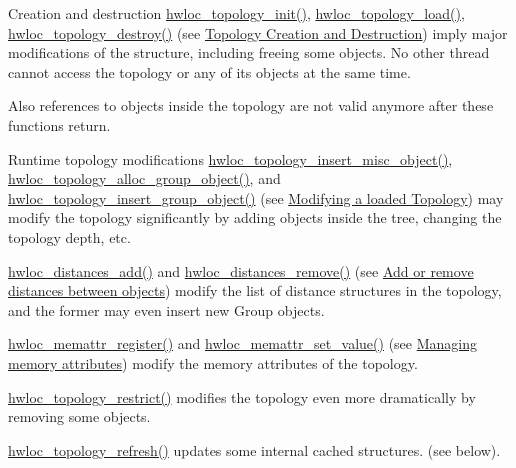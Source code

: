 \begin{DoxyDescription}
\item[Creation and destruction ]{\ttfamily \hyperlink{a00186_ga03fd4a16d8b9ee1ffc32b25fd2f6bdfa}{hwloc\+\_\+topology\+\_\+init()}, \hyperlink{a00186_gabdf58d87ad77f6615fccdfe0535ff826}{hwloc\+\_\+topology\+\_\+load()}, \hyperlink{a00186_ga9f34a640b6fd28d23699d4d084667b15}{hwloc\+\_\+topology\+\_\+destroy()}} (see \hyperlink{a00186}{Topology Creation and Destruction}) imply major modifications of the structure, including freeing some objects. No other thread cannot access the topology or any of its objects at the same time.

Also references to objects inside the topology are not valid anymore after these functions return. 


\item[Runtime topology modifications ]{\ttfamily \hyperlink{a00194_gad980782ade737900c5cf208946768c30}{hwloc\+\_\+topology\+\_\+insert\+\_\+misc\+\_\+object()}}, {\ttfamily \hyperlink{a00194_ga4cea4741165faf5323931a9ed8786ef7}{hwloc\+\_\+topology\+\_\+alloc\+\_\+group\+\_\+object()}}, and {\ttfamily \hyperlink{a00194_ga1fc6012b3e1c249b83f48cb7bcacaa5b}{hwloc\+\_\+topology\+\_\+insert\+\_\+group\+\_\+object()}} (see \hyperlink{a00194}{Modifying a loaded Topology}) may modify the topology significantly by adding objects inside the tree, changing the topology depth, etc.

{\ttfamily \hyperlink{a00210_gac5a71d96cd86efe31d6f8d282aae3d97}{hwloc\+\_\+distances\+\_\+add()}} and {\ttfamily \hyperlink{a00210_gac188d9b64d9560255ce5f6d0a20f9c0a}{hwloc\+\_\+distances\+\_\+remove()}} (see \hyperlink{a00210}{Add or remove distances between objects}) modify the list of distance structures in the topology, and the former may even insert new Group objects.

{\ttfamily \hyperlink{a00212_ga770657d1e44b09e93e09f623936c1e5f}{hwloc\+\_\+memattr\+\_\+register()}} and {\ttfamily \hyperlink{a00212_ga960529c08b25cf15825e0f72ecceb504}{hwloc\+\_\+memattr\+\_\+set\+\_\+value()}} (see \hyperlink{a00212}{Managing memory attributes}) modify the memory attributes of the topology.

{\ttfamily \hyperlink{a00194_ga6db81ed13ac0a9d70cc80372ab537815}{hwloc\+\_\+topology\+\_\+restrict()}} modifies the topology even more dramatically by removing some objects.

{\ttfamily \hyperlink{a00194_ga698ecd640d2b76742bba3829a145cd9a}{hwloc\+\_\+topology\+\_\+refresh()}} updates some internal cached structures. (see below).


\end{DoxyDescription}
